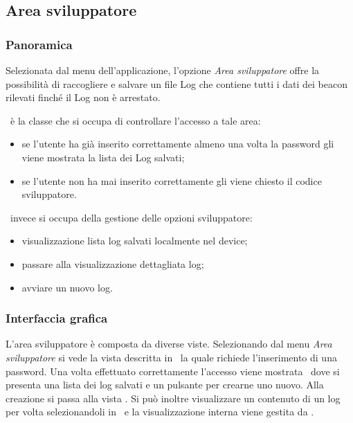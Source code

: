 \documentclass[../Funzionalita.tex]{subfiles}
\begin{document}
\subsection{Area sviluppatore}
\label{subsec:AreaSviluppatore}
	
	\subsubsection{Panoramica}
		Selezionata dal menu dell'applicazione, l'opzione \textit{Area sviluppatore} offre la possibilità di raccogliere e salvare un file Log che contiene tutti i dati dei beacon rilevati finché il Log non è arrestato.
		
		\MainDeveloperPresenter\ è la classe che si occupa di controllare l'accesso a tale area:
		\begin{itemize}
			\item se l'utente ha già inserito correttamente almeno una volta la password gli viene mostrata la lista dei Log salvati;
			\item se l'utente non ha mai inserito correttamente gli viene chiesto il codice sviluppatore.
		\end{itemize}
		
		\MainDeveloperActivity\ invece si occupa della gestione delle opzioni sviluppatore:
		\begin{itemize}
			\item visualizzazione lista log salvati localmente nel device;
			\item passare alla visualizzazione dettagliata log;
			\item avviare un nuovo log.
		\end{itemize}
			

	\subsubsection{Interfaccia grafica}
		L'area sviluppatore è composta da diverse viste. Selezionando dal menu \textit{Area sviluppatore} si vede la vista descritta in \DeveloperUnlockerView\ la quale richiede l'inserimento di una password. Una volta effettuato correttamente l'accesso viene mostrata \MainDeveloperView\ dove si presenta una lista dei log salvati e un pulsante per crearne uno nuovo. Alla creazione si passa alla vista \LoggingView. Si può inoltre visualizzare un contenuto di un log per volta selezionandoli in \MainDeveloperView\ e la visualizzazione interna viene gestita da \LogInformationView.
		
\end{document}
